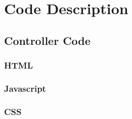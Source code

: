 \chapter{Code Description}\label{ch:codeDescription}
\section{Controller Code}\label{controllerCode}
\subsection{HTML}\label{controllerHTML}


\subsection{Javascript}\label{controllerJavascript}


\subsection{CSS}\label{controllerCSS}

